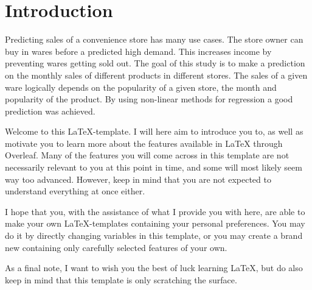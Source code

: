 

\section{Introduction}
Predicting sales of a convenience store has many use cases. The store owner can buy in wares before a predicted high demand. This increases income by preventing wares getting sold out.
\newline %
The goal of this study is to make a prediction on the monthly sales of different products in different stores. The sales of a given ware logically depends on the popularity of a given store, the month and popularity of the product.
\newline %
By using non-linear methods for regression a good prediction was achieved.

Welcome to this \LaTeX-template. I will here aim to introduce you to, as well as motivate you to learn more about the features available in LaTeX through Overleaf. Many of the features you will come across in this template are not necessarily relevant to you at this point in time, and some will most likely seem way too advanced. However, keep in mind that you are not expected to understand everything at once either.

I hope that you, with the assistance of what I provide you with here, are able to make your own LaTeX-templates containing your personal preferences. You may do it by directly changing variables in this template, or you may create a brand new containing only carefully selected features of your own. 

As a final note, I want to wish you the best of luck learning LaTeX, but do also keep in mind that this template is only scratching the surface.

\nocite{imt_software_wiki}  %